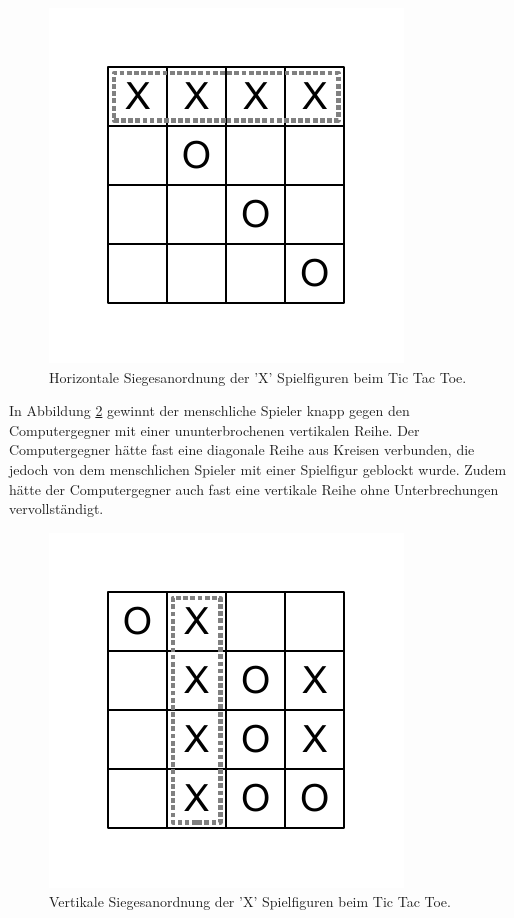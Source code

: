 \begin{figure}[!htbp]
  \centering
  \includegraphics[scale = 1]{inhalt/abbildungen/horizontaler_sieg.pdf}
  \caption{Horizontale Siegesanordnung der 'X' Spielfiguren beim Tic Tac Toe.}
  \label{fig:tttHorizontalerSieg}
\end{figure}

In Abbildung \ref{fig:tttVertikalerSieg} gewinnt der menschliche Spieler knapp gegen den Computergegner mit einer ununterbrochenen vertikalen Reihe. Der Computergegner hätte fast eine diagonale Reihe aus Kreisen verbunden, die jedoch von dem menschlichen Spieler mit einer Spielfigur geblockt wurde. Zudem hätte der Computergegner auch fast eine vertikale Reihe ohne Unterbrechungen vervollständigt.

\begin{figure}[!htbp]
  \centering
  \includegraphics[scale = 1]{inhalt/abbildungen/vertikaler_sieg.pdf}
  \caption{Vertikale Siegesanordnung der 'X' Spielfiguren beim Tic Tac Toe.}
  \label{fig:tttVertikalerSieg}
\end{figure}

